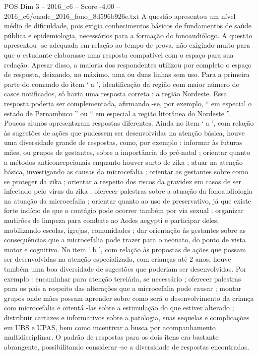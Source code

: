 \begin{textsample}{POS Dim 3 – 2016\_c6 – Score -4.00 – 2016\_c6/enade\_2016\_fono\_8d596b926e.txt}
A questão apresentou um nível médio de dificuldade, pois exigia conhecimentos básicos de fundamentos de saúde pública e epidemiologia, necessários para a formação do fonoaudiólogo.
A questão apresentou -se adequada em relação ao tempo de prova, não exigindo muito para que o estudante elaborasse uma resposta compatível com o espaço para sua redação.
Apesar disso, a maioria dos respondentes utilizou por completo o espaço de resposta, deixando, no máximo, uma ou duas linhas sem uso.
Para a primeira parte do comando do item ‘ a ’, identificação da região com maior número de casos notificados, só havia uma resposta correta : a região Nordeste.
Essa resposta poderia ser complementada, afirmando -se, por exemplo, “ em especial o estado de Pernambuco ” ou “ em especial a região litorânea do Nordeste ”.
Poucos alunos apresentaram respostas diferentes.
Ainda no item ‘ a ’, com relação às sugestões de ações que pudessem ser desenvolvidas na atenção básica, houve uma diversidade grande de respostas, como, por exemplo : informar às futuras mães, ou grupos de gestantes, sobre a importância do pré-natal ; orientar quanto a métodos anticoncepcionais enquanto houver surto de zika ; atuar na atenção básica, investigando as causas da microcefalia ; orientar as gestantes sobre como se proteger da zika ; orientar a respeito dos riscos da gravidez em casos de ser infectado pelo vírus da zika ; oferecer palestras sobre a atuação da fonoaudiologia na atuação da microcefalia ; orientar quanto ao uso de preservativo, já que existe forte indício de que o contágio pode ocorrer também por via sexual ; organizar mutirões de limpeza para combate ao Aedes aegypti e participar deles, mobilizando escolas, igrejas, comunidades ; dar orientação às gestantes sobre as consequências que a microcefalia pode trazer para o neonato, do ponto de vista motor e cognitivo.
No item ‘ b ’, com relação às propostas de ações que possam ser desenvolvidas na atenção especializada, com crianças até 2 anos, houve também uma boa diversidade de sugestões que poderiam ser desenvolvidas.
Por exemplo : encaminhar para atenção terciária, se necessário ; oferecer palestras para os pais a respeito das alterações que a microcefalia pode causar ; montar grupos onde mães possam aprender sobre como será o desenvolvimento da criança com microcefalia e orientá -las sobre a estimulação do que estiver alterado ; distribuir cartazes e informativos sobre a patologia, suas sequelas e complicações em UBS e UPAS, bem como incentivar a busca por acompanhamento multidisciplinar.
O padrão de respostas para os dois itens era bastante abrangente, possibilitando considerar -se a diversidade de respostas encontradas.

\end{textsample}

